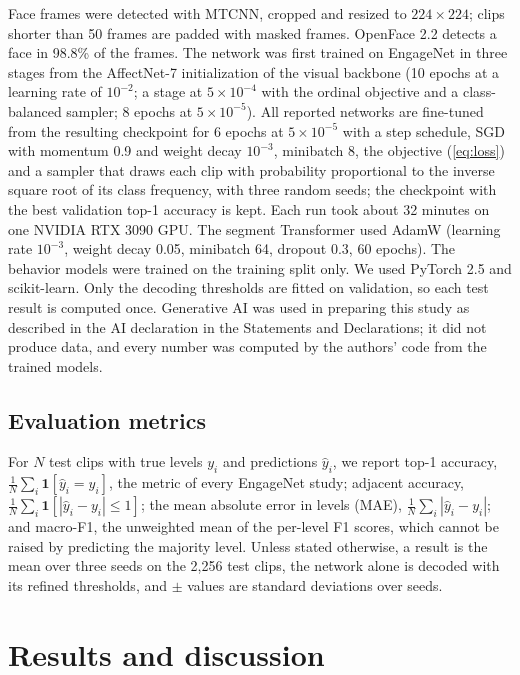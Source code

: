 \documentclass[pdflatex,iicol,sn-basic]{sn-jnl}
\begin{document}
Face frames were detected with MTCNN, cropped and resized to $224 \times 224$; clips shorter than 50 frames are padded with masked frames. OpenFace 2.2 detects a face in 98.8\% of the frames. The network was first trained on EngageNet in three stages from the AffectNet-7 initialization of the visual backbone (10 epochs at a learning rate of $10^{-2}$; a stage at $5 \times 10^{-4}$ with the ordinal objective and a class-balanced sampler; 8 epochs at $5 \times 10^{-5}$). All reported networks are fine-tuned from the resulting checkpoint for 6 epochs at $5 \times 10^{-5}$ with a step schedule, SGD with momentum 0.9 and weight decay $10^{-3}$, minibatch 8, the objective (\ref{eq:loss}) and a sampler that draws each clip with probability proportional to the inverse square root of its class frequency, with three random seeds; the checkpoint with the best validation top-1 accuracy is kept. Each run took about 32 minutes on one NVIDIA RTX 3090 GPU. The segment Transformer used AdamW (learning rate $10^{-3}$, weight decay 0.05, minibatch 64, dropout 0.3, 60 epochs). The behavior models were trained on the training split only. We used PyTorch 2.5 and scikit-learn. Only the decoding thresholds are fitted on validation, so each test result is computed once. Generative AI was used in preparing this study as described in the AI declaration in the Statements and Declarations; it did not produce data, and every number was computed by the authors' code from the trained models.

\subsection{Evaluation metrics}\label{sec:metrics}

For $N$ test clips with true levels $y_i$ and predictions $\hat{y}_i$, we report top-1 accuracy, $\frac{1}{N}\sum_i \mathbf{1}[\hat{y}_i = y_i]$, the metric of every EngageNet study; adjacent accuracy, $\frac{1}{N}\sum_i \mathbf{1}[|\hat{y}_i - y_i| \le 1]$; the mean absolute error in levels (MAE), $\frac{1}{N}\sum_i |\hat{y}_i - y_i|$; and macro-F1, the unweighted mean of the per-level F1 scores, which cannot be raised by predicting the majority level. Unless stated otherwise, a result is the mean over three seeds on the 2,256 test clips, the network alone is decoded with its refined thresholds, and $\pm$ values are standard deviations over seeds.

\section{Results and discussion}\label{sec:results}
\end{document}
